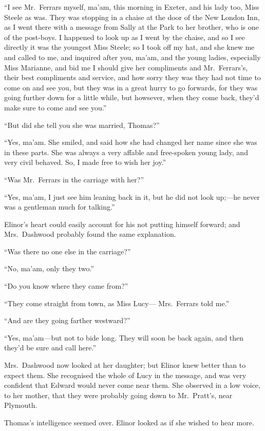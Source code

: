 \documentclass{article}
\begin{document}
``I see Mr.\ Ferrars myself, ma'am, this morning
in Exeter, and his lady too, Miss Steele as was.  They was
stopping in a chaise at the door of the New London Inn,
as I went there with a message from Sally at the Park
to her brother, who is one of the post-boys. I happened
to look up as I went by the chaise, and so I see directly
it was the youngest Miss Steele; so I took off my hat,
and she knew me and called to me, and inquired after you,
ma'am, and the young ladies, especially Miss Marianne,
and bid me I should give her compliments and Mr.\ Ferrars's,
their best compliments and service, and how sorry they
was they had not time to come on and see you, but they was
in a great hurry to go forwards, for they was going further
down for a little while, but howsever, when they come back,
they'd make sure to come and see you.''

``But did she tell you she was married, Thomas?''

``Yes, ma'am. She smiled, and said how she
had changed her name since she was in these parts.
She was always a very affable and free-spoken young lady,
and very civil behaved.  So, I made free to wish her joy.''

``Was Mr.\ Ferrars in the carriage with her?''

``Yes, ma'am, I just see him leaning back in it,
but he did not look up;---he never was a gentleman much
for talking.''

Elinor's heart could easily account for his not
putting himself forward; and Mrs.\ Dashwood probably
found the same explanation.

``Was there no one else in the carriage?''

``No, ma'am, only they two.''

``Do you know where they came from?''

``They come straight from town, as Miss Lucy---%
Mrs.\ Ferrars told me.''

``And are they going farther westward?''

``Yes, ma'am---but not to bide long.  They will soon
be back again, and then they'd be sure and call here.''

Mrs.\ Dashwood now looked at her daughter;
but Elinor knew better than to expect them.
She recognised the whole of Lucy in the message, and was
very confident that Edward would never come near them.
She observed in a low voice, to her mother, that they
were probably going down to Mr.\ Pratt's, near Plymouth.

Thomas's intelligence seemed over.  Elinor looked
as if she wished to hear more.
\end{document}
